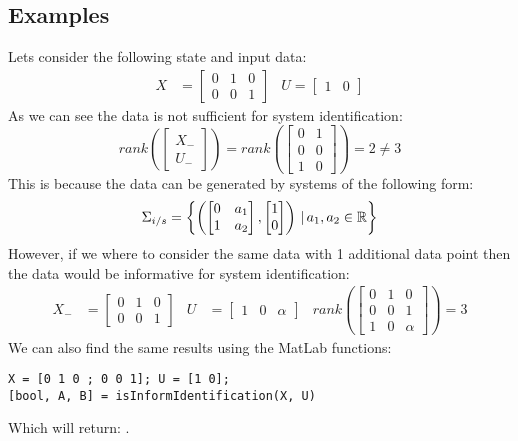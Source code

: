 \subsection{Examples}
Lets consider the following state and input data:
\begin{align*}
	X &= \begin{bmatrix} 0&1&0 \\ 0&0&1 \end{bmatrix} & U = \begin{bmatrix}	1&0	\end{bmatrix}
\end{align*} 
As we can see the data is not sufficient for system identification:
\begin{equation*}
	rank\left( \begin{bmatrix} X_{-} \\ U_{-} \end{bmatrix} \right) = rank\left( \begin{bmatrix} 0&1 \\ 0&0 \\ 1&0 \end{bmatrix} \right) = 2 \neq 3
\end{equation*}
This is because the data can be generated by systems of the following form:
\[ \Sigma_{i/s} = \left\{ \left( \begin{bmatrix} 0&a_1 \\ 1&a_2 \end{bmatrix}, \begin{bmatrix} 1 \\ 0 \end{bmatrix} \right) \, | \, a_1, a_2 \in \mathbb{R} \right\} \]
However, if we where to consider the same data with 1 additional data point then the data would be informative for system identification:
\begin{align*}
	X_- &= \begin{bmatrix} 0&1&0 \\ 0&0&1 \end{bmatrix} & U &= \begin{bmatrix}	1&0&\alpha	\end{bmatrix} & rank\left( \begin{bmatrix} 0&1&0 \\ 0&0&1 \\ 1&0&\alpha \end{bmatrix} \right) =  3
\end{align*} 
We can also find the same results using the MatLab functions:
\begin{lstlisting}
X = [0 1 0 ; 0 0 1]; U = [1 0];
[bool, A, B] = isInformIdentification(X, U)
\end{lstlisting}
Which will return: \mon{[ false, [], [] ]}.




